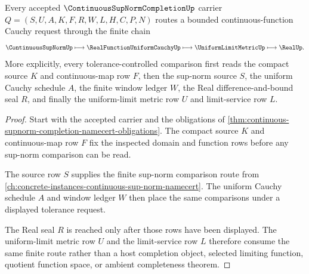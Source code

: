 \begin{theorem}
\label{thm:continuous-supnorm-completion-cauchy-route}
Every accepted $\ContinuousSupNormCompletionUp$ carrier $Q=(S,U,A,K,F,R,W,L,H,C,P,N)$ routes a bounded continuous-function Cauchy request through the finite chain
$$
\ContinuousSupNormUp \longmapsto \RealFunctionUniformCauchyUp \longmapsto \UniformLimitMetricUp \longmapsto \RealUp .
$$
More explicitly, every tolerance-controlled comparison first reads the compact source $K$ and continuous-map row $F$, then the sup-norm source $S$, the uniform Cauchy schedule $A$, the finite window ledger $W$, the Real difference-and-bound seal $R$, and finally the uniform-limit metric row $U$ and limit-service row $L$.
\end{theorem}
\begin{proof}
Start with the accepted carrier and the obligations of \autoref{thm:continuous-supnorm-completion-namecert-obligations}. The compact source $K$ and continuous-map row $F$ fix the inspected domain and function rows before any sup-norm comparison can be read.

The source row $S$ supplies the finite sup-norm comparison route from \autoref{ch:concrete-instances-continuous-sup-norm-namecert}. The uniform Cauchy schedule $A$ and window ledger $W$ then place the same comparisons under a displayed tolerance request.

The Real seal $R$ is reached only after those rows have been displayed. The uniform-limit metric row $U$ and the limit-service row $L$ therefore consume the same finite route rather than a host completion object, selected limiting function, quotient function space, or ambient completeness theorem.
\end{proof}

